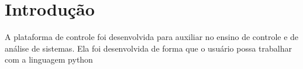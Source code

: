 
\chapter{Introdução}%
\label{chapter:introduction}

A plataforma de controle foi desenvolvida para auxiliar no ensino de controle
e de análise de sistemas. Ela foi desenvolvida de forma que o usuário possa trabalhar com a linguagem python

